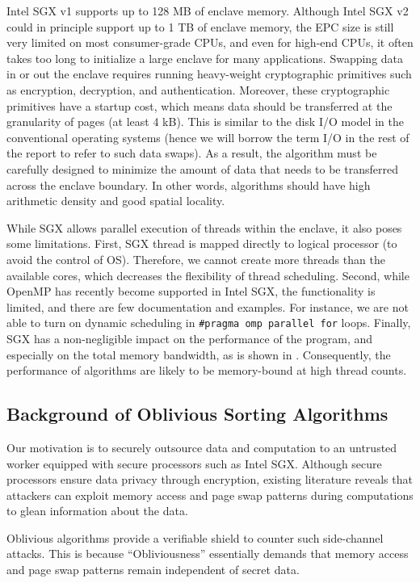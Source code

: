 \documentclass{article}
\begin{document}
Intel SGX v1 supports up to 128 MB of enclave memory. Although Intel SGX v2 could in principle support up to 1 TB of enclave memory, the EPC size is still very limited on most consumer-grade CPUs, and even for high-end CPUs, it often takes too long to initialize a large enclave for many applications. Swapping data in or out the enclave requires running heavy-weight cryptographic primitives such as encryption, decryption, and authentication. Moreover, these cryptographic primitives have a startup cost, which means data should be transferred at the granularity of pages (at least 4 kB). This is similar to the disk I/O model in the conventional operating systems (hence we will borrow the term I/O in the rest of the report to refer to such data swaps). As a result, the algorithm must be carefully designed to minimize the amount of data that needs to be transferred across the enclave boundary. In other words, algorithms should have high arithmetic density and good spatial locality.

While SGX allows parallel execution of threads within the enclave, it also poses some limitations. First, SGX thread is mapped directly to logical processor (to avoid the control of OS). Therefore, we cannot create more threads than the available cores, which decreases the flexibility of thread scheduling. Second, while OpenMP has recently become supported in Intel SGX, the functionality is limited, and there are few documentation and examples. For instance, we are not able to turn on dynamic scheduling in {\tt \#pragma omp parallel for} loops. Finally, SGX has a non-negligible impact on the performance of the program, and especially on the total memory bandwidth, as is shown in \cite{sgxv2benchmark, portorshim}. Consequently, the performance of algorithms are likely to be memory-bound at high thread counts.

\subsection{Background of Oblivious Sorting Algorithms}
Our motivation is to securely outsource data and computation to an untrusted worker equipped with secure processors such as Intel SGX. Although secure processors ensure data privacy through encryption, existing literature reveals that attackers can exploit memory access and page swap patterns during computations to glean information about the data.

Oblivious algorithms provide a verifiable shield to counter such side-channel attacks. This is because ``Obliviousness'' essentially demands that memory access and page swap patterns remain independent of secret data. 
\end{document}
